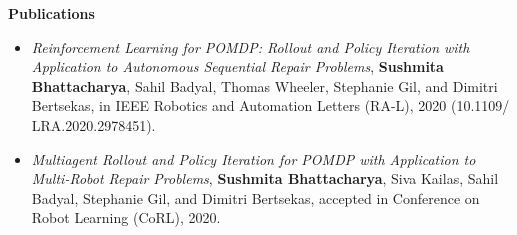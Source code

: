 \documentclass[a4paper,11pt]{article}
\newcommand{\resheading}[1]{{\small \colorbox{mygrey}{\begin{minipage}{0.975\textwidth}{\textbf{#1 \vphantom{p\^{E}}}}\end{minipage}}}}
\begin{document}
	
	
	
	\resheading{\textbf{\large Publications}}
	\begin{description}
	\item 
		\begin{itemize}
		\item \textit{Reinforcement Learning for POMDP: Rollout and Policy Iteration with Application to Autonomous Sequential Repair Problems}, \textbf{Sushmita Bhattacharya}, Sahil Badyal, Thomas Wheeler, Stephanie Gil, and Dimitri Bertsekas, in IEEE Robotics and Automation Letters (RA-L), 2020 (10.1109/ LRA.2020.2978451).
	\end{itemize}
\item 
	\begin{itemize}
		\item \textit{Multiagent Rollout and Policy Iteration for POMDP with Application to Multi-Robot Repair Problems}, \textbf{Sushmita Bhattacharya}, Siva Kailas, Sahil Badyal, Stephanie Gil, and Dimitri Bertsekas, accepted in Conference on Robot Learning (CoRL), 2020. 
	\end{itemize}
	\end{description}
	
	
	
\end{document}
